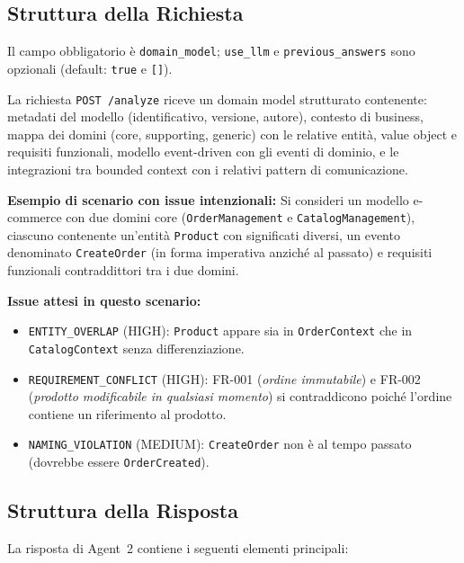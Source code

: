 \documentclass[12pt,a4paper]{report}
\begin{document}
\subsection{Struttura della Richiesta}

Il campo obbligatorio è \texttt{domain\_model}; \texttt{use\_llm} e
\texttt{previous\_answers} sono opzionali (default: \texttt{true} e \texttt{[]}).

La richiesta \texttt{POST /analyze} riceve un domain model strutturato
contenente: metadati del modello (identificativo, versione, autore),
contesto di business, mappa dei domini (core, supporting, generic) con
le relative entità, value object e requisiti funzionali, modello
event-driven con gli eventi di dominio, e le integrazioni tra bounded
context con i relativi pattern di comunicazione.

\textbf{Esempio di scenario con issue intenzionali:} Si consideri un
modello e-commerce con due domini core (\texttt{OrderManagement} e
\texttt{CatalogManagement}), ciascuno contenente un'entità
\texttt{Product} con significati diversi, un evento denominato
\texttt{CreateOrder} (in forma imperativa anziché al passato) e
requisiti funzionali contraddittori tra i due domini.

\textbf{Issue attesi in questo scenario:}
\begin{itemize}
  \item \texttt{ENTITY\_OVERLAP} (HIGH): \texttt{Product} appare sia in
        \texttt{OrderContext} che in \texttt{CatalogContext} senza differenziazione.
  \item \texttt{REQUIREMENT\_CONFLICT} (HIGH): FR-001 (\textit{ordine immutabile})
        e FR-002 (\textit{prodotto modificabile in qualsiasi momento}) si contraddicono
        poiché l'ordine contiene un riferimento al prodotto.
  \item \texttt{NAMING\_VIOLATION} (MEDIUM): \texttt{CreateOrder} non è al tempo
        passato (dovrebbe essere \texttt{OrderCreated}).
\end{itemize}

\subsection{Struttura della Risposta}

La risposta di Agent~2 contiene i seguenti elementi principali:
\end{document}

